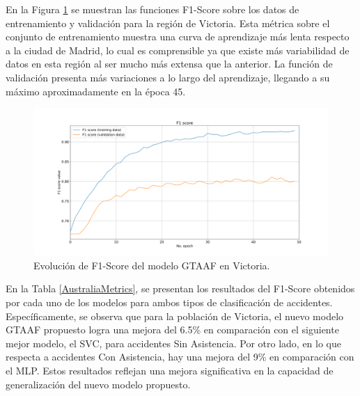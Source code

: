 En la Figura \ref{VictoriaLossFunction} se muestran las funciones F1-Score sobre los datos de entrenamiento y validación para la región de Victoria. Esta métrica sobre el conjunto de entrenamiento muestra una curva de aprendizaje más lenta respecto a la ciudad de Madrid, lo cual es comprensible ya que existe más variabilidad de datos en esta región al ser mucho más extensa que la anterior. La función de validación presenta más variaciones a lo largo del aprendizaje, llegando a su máximo aproximadamente en la época 45.

\begin{figure}[h]
	\centering
	\includegraphics[width=160mm]{Figures/Victoria/Victoria_convolution_2d_f1_score_paper.png}
	\caption{Evolución de F1-Score del modelo GTAAF en Victoria.}
	\label{VictoriaLossFunction}
\end{figure}

En la Tabla \ref{AustraliaMetrics}, se presentan los resultados del F1-Score obtenidos por cada uno de los modelos para ambos tipos de clasificación de accidentes. Específicamente, se observa que para la población de Victoria, el nuevo modelo GTAAF propuesto logra una mejora del 6.5\% en comparación con el siguiente mejor modelo, el SVC, para accidentes Sin Asistencia. Por otro lado, en lo que respecta a accidentes Con Asistencia, hay una mejora del 9\% en comparación con el MLP. Estos resultados reflejan una mejora significativa en la capacidad de generalización del nuevo modelo propuesto.


